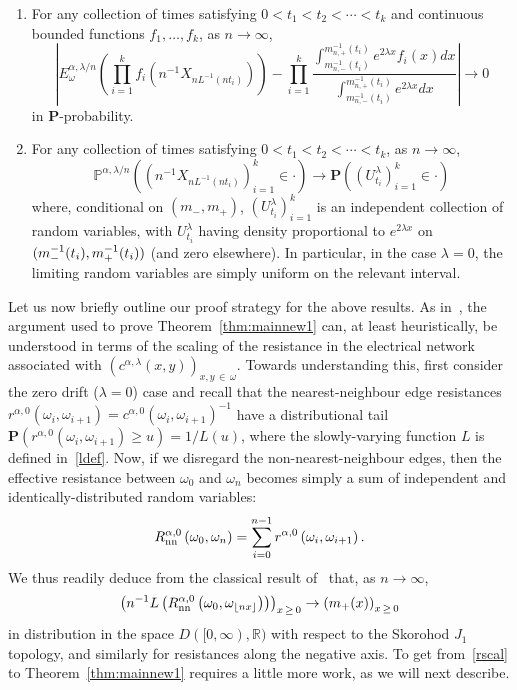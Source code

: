 \documentclass[AHL,Unicode,longabstracts,published]{cedram}
\newcommand{\R}{\mathbb R}
\renewcommand{\P}{\mathbb P}
\newcommand{\bfP}{\mathbf{P}}
\newcommand*{\alphenumi}{\renewcommand*{\theenumi}{\alph{enumi}}}
\begin{document}
\begin{theo}\label{thm:mainnew3}\leavevmode
\begin{enumerate}\alphenumi
\item\label{theo1.4.a} For any collection of times satisfying $0<t_1<t_2<\cdots<t_k$ and continuous bounded functions $f_1,\dots,f_k$, as $n\rightarrow\infty$,
\[
\left|E^{\alpha,\lambda/n}_\omega\left(\prod_{i=1}^kf_i\left(n^{-1}{X}_{nL^{-1}(nt_i)}\right)\right)-\prod_{i=1}^k\frac{\int_{m_{n,-}^{-1}(t_i)}^{m_{n,+}^{-1}(t_i)}e^{2\lambda x}f_i(x)dx}{\int_{m_{n,-}^{-1}(t_i)}^{m_{n,+}^{-1}(t_i)}e^{2\lambda x}dx}\right|
\rightarrow0
\]
in $\bfP$-probability.
\item\label{theo1.4.b} For any collection of times satisfying $0<t_1<t_2<\cdots<t_k$, as $n\rightarrow\infty$,
\[
\P^{\alpha,\lambda/n}\left(\left(n^{-1}{X}_{nL^{-1}(nt_i)}\right)_{i=1}^k\in \cdot\right)\rightarrow \bfP\left(\left(U^\lambda_{t_i}\right)_{i=1}^k\in\cdot\right)
\]
where, conditional on $(m_-,m_+)$, $(U^\lambda_{t_i})_{i=1}^k$ is an independent collection of random variables, with $U^\lambda_{t_i}$ having density proportional to $e^{2\lambda x}$ on $(m_-^{-1}(t_i),m_+^{-1}\linebreak(t_i))$ (and zero elsewhere). In particular, in the case $\lambda=0$, the limiting random variables are simply uniform on the relevant interval.
\end{enumerate}
\end{theo}

Let us now briefly outline our proof strategy for the above results. As in~\cite{CFJ}, the argument used to prove Theorem~\ref{thm:mainnew1} can, at least heuristically, be understood in terms of the scaling of the resistance in the electrical network associated with $(c^{\alpha,\lambda}(x,y))_{x,y\,\in\,\omega}$. Towards understanding this, first consider the zero drift ($\lambda=0$) case and recall that the nearest-neighbour edge resistances $r^{\alpha,0}(\omega_i,\omega_{i+1})=c^{\alpha,0}(\omega_i,\omega_{i+1})^{-1}$ have a distributional tail $\bfP(r^{\alpha,0}(\omega_i,\omega_{i+1})\geq u)=1/L(u)$, where the slowly-varying function $L$ is defined in~\eqref{ldef}. Now, if we disregard the non-nearest-neighbour edges, then the effective resistance between $\omega_0$ and $\omega_n$ becomes simply a sum of independent and identically-distributed random variables:
\[
R^{\alpha,0}_{\text{\upshape{nn}}}\left(\omega_0,\omega_n\right)=\sum_{i=0}^{n-1}r^{\alpha,0}\left(\omega_{i},\omega_{i+1}\right).
\]
We thus readily deduce from the classical result of~\cite[Theorem~2.1]{Kasa} that, as $n\to\infty$,
\begin{equation}\label{rscal}
\left(n^{-1}L\left(R^{\alpha,0}_{\text{\upshape{nn}}}\left(\omega_0,\omega_{\lfloor nx\rfloor}\right)\right)\right)_{x\,\geq\,0}\rightarrow \left(m_+(x)\right)_{x\,\geq\,0}
\end{equation}
in distribution in the space $D([0,\infty),\R)$ with respect to the Skorohod $J_1$ topology, and similarly for resistances along the negative axis. To get from~\eqref{rscal} to Theorem~\ref{thm:mainnew1} requires a little more work, as we will next describe.
\end{document}
